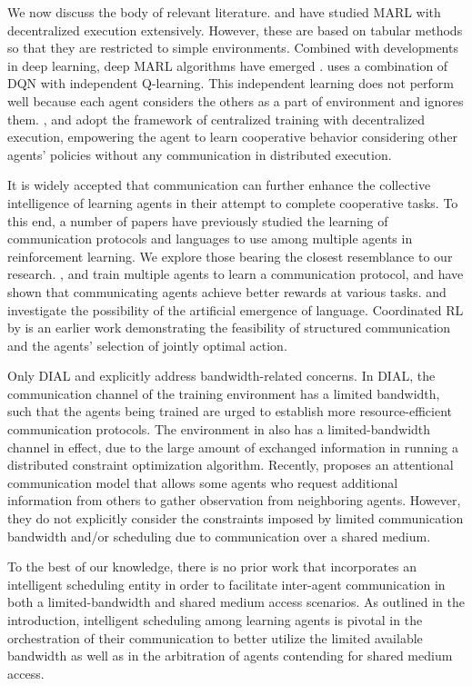  We now discuss the body of relevant
literature. \citet{busoniu2008} and \citet{iql} have studied MARL with
decentralized execution extensively. However, these are based on
tabular methods so that they are restricted to simple environments.
Combined with developments in deep learning, deep MARL algorithms have
emerged \citep{tampuu2017multiagent, coma, lowe2017multi}.
\citet{tampuu2017multiagent} uses a combination of DQN with
independent Q-learning. This independent learning does not perform
well because each agent considers the others as a part of environment
and ignores them. \citet{coma, lowe2017multi, gupta2017cooperative,
  vdn}, and \citet{foerster2017stabilising} adopt the framework of centralized training with
decentralized execution, empowering the agent to learn cooperative
behavior considering other agents' policies without any communication
in distributed execution.

It is widely accepted that communication can further enhance the
collective intelligence of learning agents in their attempt to
complete cooperative tasks. To this end, a number of papers have
previously studied the learning of communication protocols and
languages to use among multiple agents in reinforcement learning. We
explore those bearing the closest resemblance to our research.
\citet{dial,commnet,bicnet, guestrin2002}, and \citet{zhang2013} train multiple
agents to learn a communication protocol, and have shown that
communicating agents achieve better rewards at various tasks.  \citet
{mordatch2017grounded} and \citet{havrylov2017} investigate the possibility of the
artificial emergence of language. Coordinated RL by
\citet{guestrin2002} is an earlier work demonstrating the feasibility
of structured communication and the agents' selection of jointly
optimal action.

Only DIAL \citep{dial} and \citet{zhang2013} explicitly address
bandwidth-related concerns. In DIAL, the communication channel of the
training environment has a limited bandwidth, such that the agents
being trained are urged to establish more resource-efficient
communication protocols. The environment in \citet{zhang2013} also has
a limited-bandwidth channel in effect, due to the large amount of
exchanged information in running a distributed constraint optimization
algorithm. Recently, \citet{attentional_comm} proposes an attentional communication model
that allows some agents who request additional information from others to
gather observation from neighboring agents. However, they
do not explicitly consider the constraints imposed by limited communication bandwidth and/or scheduling due to communication over a shared medium.

To the best of our knowledge, there is no prior work that incorporates an
intelligent scheduling entity in order to facilitate inter-agent
communication in both a limited-bandwidth and shared medium access
scenarios. As outlined in the introduction, intelligent scheduling
among learning agents is pivotal in the orchestration of their
communication to better utilize the limited available
bandwidth as well as in the arbitration of agents contending 
for shared medium access.




